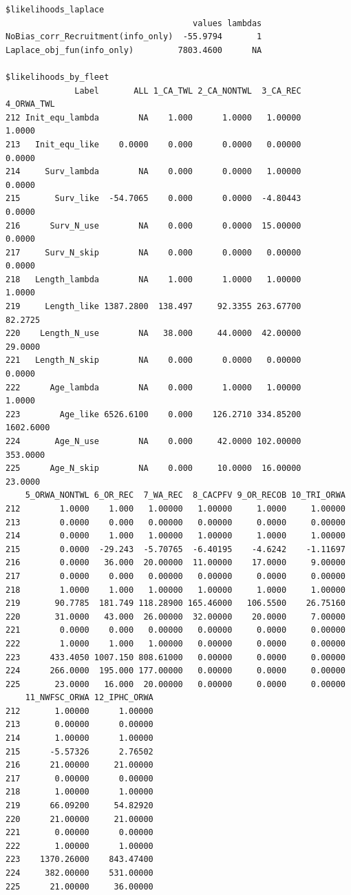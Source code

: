\documentclass[
]{scrartcl}
\begin{document}
\begin{verbatim}
$likelihoods_laplace
                                      values lambdas
NoBias_corr_Recruitment(info_only)  -55.9794       1
Laplace_obj_fun(info_only)         7803.4600      NA

$likelihoods_by_fleet
              Label       ALL 1_CA_TWL 2_CA_NONTWL  3_CA_REC 4_ORWA_TWL
212 Init_equ_lambda        NA    1.000      1.0000   1.00000     1.0000
213   Init_equ_like    0.0000    0.000      0.0000   0.00000     0.0000
214     Surv_lambda        NA    0.000      0.0000   1.00000     0.0000
215       Surv_like  -54.7065    0.000      0.0000  -4.80443     0.0000
216      Surv_N_use        NA    0.000      0.0000  15.00000     0.0000
217     Surv_N_skip        NA    0.000      0.0000   0.00000     0.0000
218   Length_lambda        NA    1.000      1.0000   1.00000     1.0000
219     Length_like 1387.2800  138.497     92.3355 263.67700    82.2725
220    Length_N_use        NA   38.000     44.0000  42.00000    29.0000
221   Length_N_skip        NA    0.000      0.0000   0.00000     0.0000
222      Age_lambda        NA    0.000      1.0000   1.00000     1.0000
223        Age_like 6526.6100    0.000    126.2710 334.85200  1602.6000
224       Age_N_use        NA    0.000     42.0000 102.00000   353.0000
225      Age_N_skip        NA    0.000     10.0000  16.00000    23.0000
    5_ORWA_NONTWL 6_OR_REC  7_WA_REC  8_CACPFV 9_OR_RECOB 10_TRI_ORWA
212        1.0000    1.000   1.00000   1.00000     1.0000     1.00000
213        0.0000    0.000   0.00000   0.00000     0.0000     0.00000
214        0.0000    1.000   1.00000   1.00000     1.0000     1.00000
215        0.0000  -29.243  -5.70765  -6.40195    -4.6242    -1.11697
216        0.0000   36.000  20.00000  11.00000    17.0000     9.00000
217        0.0000    0.000   0.00000   0.00000     0.0000     0.00000
218        1.0000    1.000   1.00000   1.00000     1.0000     1.00000
219       90.7785  181.749 118.28900 165.46000   106.5500    26.75160
220       31.0000   43.000  26.00000  32.00000    20.0000     7.00000
221        0.0000    0.000   0.00000   0.00000     0.0000     0.00000
222        1.0000    1.000   1.00000   0.00000     0.0000     0.00000
223      433.4050 1007.150 808.61000   0.00000     0.0000     0.00000
224      266.0000  195.000 177.00000   0.00000     0.0000     0.00000
225       23.0000   16.000  20.00000   0.00000     0.0000     0.00000
    11_NWFSC_ORWA 12_IPHC_ORWA
212       1.00000      1.00000
213       0.00000      0.00000
214       1.00000      1.00000
215      -5.57326      2.76502
216      21.00000     21.00000
217       0.00000      0.00000
218       1.00000      1.00000
219      66.09200     54.82920
220      21.00000     21.00000
221       0.00000      0.00000
222       1.00000      1.00000
223    1370.26000    843.47400
224     382.00000    531.00000
225      21.00000     36.00000


\end{verbatim}
\end{document}
